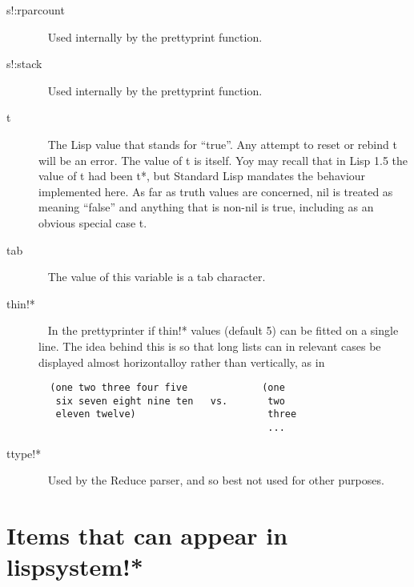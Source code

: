 \documentclass[a4paper,11pt]{article}
\begin{document}
\begin{description}
\item [{\ttfamily s!:rparcount}] ~\newline
Used internally by the prettyprint function.

\item [{\ttfamily s!:stack}] ~\newline
Used internally by the prettyprint function.

\item [{\ttfamily t}]  ~\newline
The Lisp value that stands for ``true''. Any attempt to reset or
rebind {\ttfamily t} will be an error. The value of {\ttfamily t} is
itself. Yoy may recall that in Lisp 1.5 the value of {\ttfamily t}
had been {\ttfamily *t*}, but Standard Lisp mandates the behaviour
implemented here. As far as truth values are concerned, {\ttfamily nil}
is treated as meaning ``false'' and anything that is non-{\ttfamily nil}
is true, including as an obvious special case {\ttfamily t}.

\item [{\ttfamily tab}]  ~\newline
The value of this variable is a tab character.

\item [{\ttfamily thin!*}]  ~\newline
In the prettyprinter if {\ttfamily thin!*} values (default 5) can be
fitted on a single line. The idea behind this is so that long lists can
in relevant cases be displayed almost horizontalloy rather than
vertically, as in
{\footnotesize\begin{verbatim}
  (one two three four five             (one 
   six seven eight nine ten   vs.       two
   eleven twelve)                       three
                                        ...
\end{verbatim}}

\item [{\ttfamily ttype!*}]  ~\newline
Used by the Reduce parser, and so best not used for other purposes.

\end{description} %

\section{Items that can appear in {\ttfamily lispsystem!*}} \label{lispsys}
  
\end{document}
